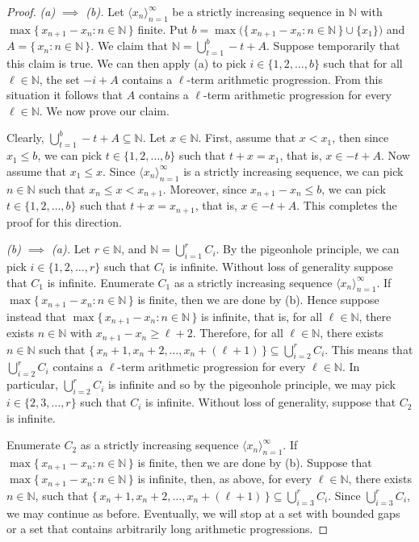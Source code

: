 \documentclass[12pt]{article}
\theoremstyle{plain}
\theoremstyle{definition}
\newcommand{\la}{\langle}
\newcommand{\ra}{\rangle}
\newcommand{\bbN}{\mathbb{N}}
\begin{document}
\begin{proof}
  \textsl{(a) $\implies$ (b).}
  Let $\la x_n \ra_{n=1}^\infty$ be a strictly increasing sequence in $\bbN$ with $\max\{\, x_{n+1} - x_n : n \in \bbN \,\}$ finite. 
  Put $b =\max\bigl(\{\, x_{n+1} - x_n : n \in \bbN \,\} \cup \{x_1\}\bigr)$ and $A = \{\, x_n : n \in \bbN \,\}$. 
  We claim that $\bbN = \bigcup_{t=1}^b -t+A$. 
  Suppose temporarily that this claim is true.
  We can then apply (a) to pick $i \in \{1, 2, \ldots, b\}$ such that for all $\ell \in \bbN$, the set $-i + A$ contains a \mbox{$\ell$-term} arithmetic progression. 
  From this situation it follows that $A$ contains a \mbox{$\ell$-term} arithmetic progression for every $\ell \in \bbN$. 
  We now prove our claim.
  
  Clearly, $\bigcup_{t=1}^b -t+A \subseteq \bbN$.
  Let $x \in \bbN$.
  First, assume that $x < x_1$, then since $x_1 \le b$, we can pick $t \in \{1, 2, \ldots, b\}$ such that $t + x = x_1$, that is, $x \in -t+A$.
  Now assume that $x_1 \le x$.
  Since $\la x_n \ra_{n=1}^\infty$ is a strictly increasing sequence, we can pick $n \in \bbN$ such that $x_n \le x < x_{n+1}$.
  Moreover, since $x_{n+1} - x_n \le b$, we can pick $t \in \{1, 2, \ldots, b\}$ such that $t + x = x_{n+1}$, that is, $x \in -t + A$. 
  This completes the proof for this direction. 

  \textsl{(b) $\implies$ (a).}
  Let $r \in \bbN$, and $\bbN = \bigcup_{i=1}^r C_i$. 
  By the pigeonhole principle, we can pick $i \in \{1, 2, \ldots, r\}$ such that $C_i$ is infinite.
  Without loss of generality suppose that $C_1$ is infinite. 
  Enumerate $C_1$ as a strictly increasing sequence $\la x_n \ra_{n=1}^\infty$.
  If $\max\{\, x_{n+1} - x_n : n \in \bbN \,\}$ is finite, then we are done by (b). 
  Hence suppose instead that $\max\{\, x_{n+1} - x_n : n \in \bbN \,\}$ is infinite, that is, for all $\ell \in \bbN$, there exists $n \in \bbN$ with $x_{n+1} - x_n \ge \ell + 2$. 
  Therefore, for all $\ell \in \bbN$, there exists $n \in \bbN$ such that $\{\, x_n + 1, x_n + 2, \ldots, x_n + (\ell + 1) \,\} \subseteq \bigcup_{i=2}^r C_i$. 
  This means that $\bigcup_{i=2}^r C_i$ contains a \mbox{$\ell$-term} arithmetic progression for every $\ell \in \bbN$.
  In particular, $\bigcup_{i=2}^r C_i$ is infinite and so by the pigeonhole principle, we may pick $i \in \{2, 3, \ldots, r\}$ such that $C_i$ is infinite.
  Without loss of generality, suppose that $C_2$ is infinite.

  Enumerate $C_2$ as a strictly increasing sequence $\la x_n \ra_{n=1}^\infty$.
  If $\max\{\, x_{n+1} - x_n : n \in \bbN \,\}$ is finite, then we are done by (b).
  Suppose that $\max\{\, x_{n+1} - x_n : n \in \bbN \,\}$ is infinite, then, as above, for every $\ell \in \bbN$, there exists $n \in \bbN$, such that $\{\, x_n +1, x_n + 2, \ldots, x_n + (\ell +1) \,\}  \subseteq \bigcup_{i=3}^r C_i$. 
  Since $\bigcup_{i=3}^r C_i$, we may continue as before.
  Eventually, we will stop at a set with bounded gaps or a set that contains arbitrarily long arithmetic progressions.%
\end{proof}
\end{document}
